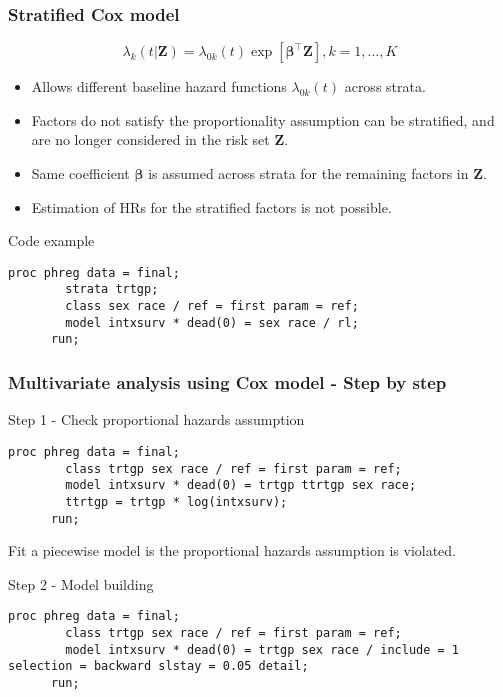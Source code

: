 \documentclass[11pt, aspectratio = 169]{beamer}
\begin{document}
\begin{frame}[fragile]
  \frametitle{Stratified Cox model}
  \begin{equation*}
    \lambda_k(t|\mathbf{Z}) = \lambda_{0k}(t)\exp\left[\boldsymbol{\beta}^\top\mathbf{Z}\right], k = 1,\dotsc,K
  \end{equation*}
  \begin{itemize}
    \item Allows different baseline hazard functions $\lambda_{0k}(t)$ across strata.
    \item Factors do not satisfy the proportionality assumption can be stratified, and are no longer considered in the risk set $\mathbf{Z}$.
    \item Same coefficient $\boldsymbol{\beta}$ is assumed across strata for the remaining factors in $\mathbf{Z}$.
    \item Estimation of HRs for the stratified factors is not possible.
  \end{itemize}
  \begin{block}{Code example}
    \begin{lstlisting}[gobble = 6]
      proc phreg data = final;
        strata trtgp;
        class sex race / ref = first param = ref;
        model intxsurv * dead(0) = sex race / rl;
      run;
    \end{lstlisting}
  \end{block}
\end{frame}

\begin{frame}[fragile]
  \frametitle{Multivariate analysis using Cox model - Step by step}
  \begin{block}{Step 1 - Check proportional hazards assumption}
    \begin{lstlisting}[gobble = 6]
      proc phreg data = final;
        class trtgp sex race / ref = first param = ref;
        model intxsurv * dead(0) = trtgp ttrtgp sex race;
        ttrtgp = trtgp * log(intxsurv);
      run;
    \end{lstlisting}
    Fit a piecewise model is the proportional hazards assumption is violated.
  \end{block}
  \begin{block}{Step 2 - Model building}
    \begin{lstlisting}[gobble = 6]
      proc phreg data = final;
        class trtgp sex race / ref = first param = ref;
        model intxsurv * dead(0) = trtgp sex race / include = 1 selection = backward slstay = 0.05 detail;
      run;
    \end{lstlisting}
  \end{block}
\end{frame}
\end{document}
